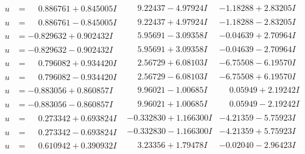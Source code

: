 \documentclass[1p]{elsarticle_modified}
\theoremstyle{definition}
\begin{document}
$$\begin{array}{c|c|c}
\begin{aligned}
u &= \phantom{-}0.886761 + 0.845005 I\end{aligned}
 & \phantom{-}9.22437 - 4.97924 I & -1.18288 + 2.83205 I \\ \hline\begin{aligned}
u &= \phantom{-}0.886761 - 0.845005 I\end{aligned}
 & \phantom{-}9.22437 + 4.97924 I & -1.18288 - 2.83205 I \\ \hline\begin{aligned}
u &= -0.829632 + 0.902432 I\end{aligned}
 & \phantom{-}5.95691 - 3.09358 I & -0.04639 + 2.70964 I \\ \hline\begin{aligned}
u &= -0.829632 - 0.902432 I\end{aligned}
 & \phantom{-}5.95691 + 3.09358 I & -0.04639 - 2.70964 I \\ \hline\begin{aligned}
u &= \phantom{-}0.796082 + 0.934420 I\end{aligned}
 & \phantom{-}2.56729 + 6.08103 I & -6.75508 - 6.19570 I \\ \hline\begin{aligned}
u &= \phantom{-}0.796082 - 0.934420 I\end{aligned}
 & \phantom{-}2.56729 - 6.08103 I & -6.75508 + 6.19570 I \\ \hline\begin{aligned}
u &= -0.883056 + 0.860857 I\end{aligned}
 & \phantom{-}9.96021 - 1.00685 I & \phantom{-}0.05949 + 2.19242 I \\ \hline\begin{aligned}
u &= -0.883056 - 0.860857 I\end{aligned}
 & \phantom{-}9.96021 + 1.00685 I & \phantom{-}0.05949 - 2.19242 I \\ \hline\begin{aligned}
u &= \phantom{-}0.273342 + 0.693824 I\end{aligned}
 & -0.332830 + 1.166300 I & -4.21359 - 5.75923 I \\ \hline\begin{aligned}
u &= \phantom{-}0.273342 - 0.693824 I\end{aligned}
 & -0.332830 - 1.166300 I & -4.21359 + 5.75923 I \\ \hline\begin{aligned}
u &= \phantom{-}0.610942 + 0.390932 I\end{aligned}
 & \phantom{-}3.23356 + 1.79478 I & -0.02040 - 2.96423 I \\ \hline\begin{aligned}

\end{aligned}
\end{array}$$
\end{document}
